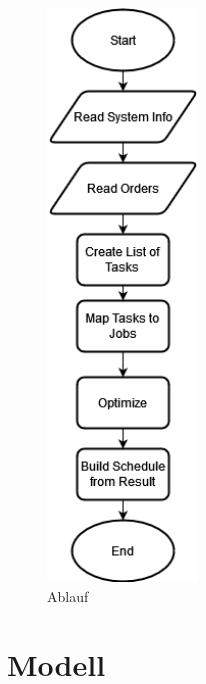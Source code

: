 \documentclass[a4paper,12pt,twoside]{scrreprt}
\begin{document}
\begin{flushleft}
	\begin{figure}[H]
		\centering
		\includegraphics[width=4cm]{images/ablauf}
		\caption{Ablauf}
		\label{fig:ablauf}
	\end{figure}
\end{flushleft}
\section*{Modell}
\end{document}
